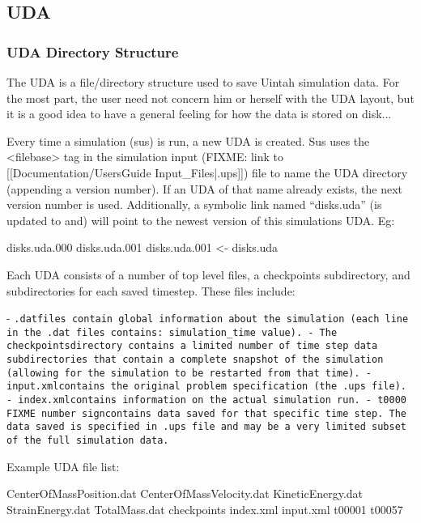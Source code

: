 \subsection{UDA}

\subsubsection{UDA Directory Structure}

The UDA is a file/directory structure used to save Uintah simulation
data.  For the most part, the user need not concern him or herself
with the UDA layout, but it is a good idea to have a general feeling
for how the data is stored on disk...


Every time a simulation (sus) is run, a new UDA is created.  Sus uses
the <filebase> tag in the simulation input
(FIXME: link to [[Documentation/UsersGuide Input\_Files|.ups]]) file to name the UDA
directory (appending a version number).  If an UDA of that name
already exists, the next version number is used.  Additionally, a
symbolic link named ``disks.uda'' (is updated to and) will point to
the newest version of this simulations UDA.  Eg:

disks.uda.000
disks.uda.001
disks.uda.001 <- disks.uda


Each UDA consists of a number of top level files, a checkpoints
subdirectory, and subdirectories for each saved timestep.  These files
include:

- \tt.dat\normalfont files contain global information about the simulation
(each line in the .dat files contains: simulation\_time value).
- The \tt checkpoints\normalfont directory contains a limited number of time
step data subdirectories that contain a complete snapshot of the
simulation (allowing for the simulation to be restarted from that
time).
- \tt input.xml\normalfont contains the original problem specification (the
.ups file).
- \tt index.xml\normalfont contains information on the actual simulation run.
- \tt t0000 FIXME number sign\normalfont contains data saved for that specific time step.  The
data saved is specified in .ups file and may be a very limited subset
of the full simulation data.

Example UDA file list:

CenterOfMassPosition.dat
CenterOfMassVelocity.dat
KineticEnergy.dat
StrainEnergy.dat
TotalMass.dat
checkpoints
index.xml
input.xml
t00001
t00057

